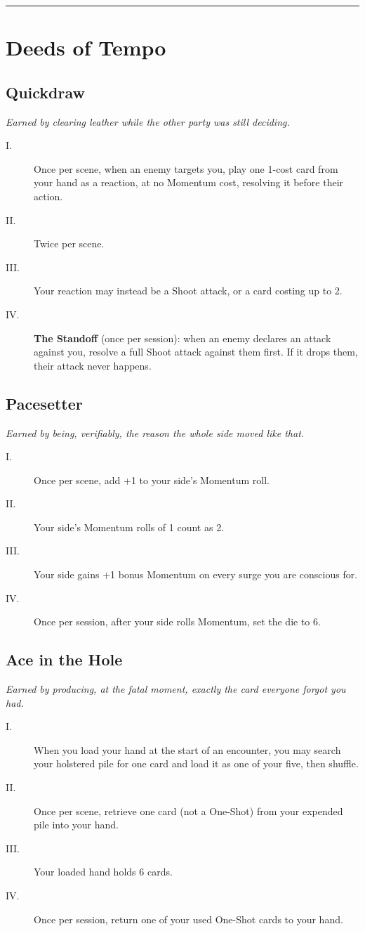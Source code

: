 \medskip\hrule\medskip

\section{Deeds of Tempo}

\subsection{Quickdraw}
\textit{Earned by clearing leather while the other party was still deciding.}
\begin{description}
    \item[I.] Once per scene, when an enemy targets you, play one 1-cost card from your hand as a reaction, at no Momentum cost, resolving it before their action.
    \item[II.] Twice per scene.
    \item[III.] Your reaction may instead be a Shoot attack, or a card costing up to 2.
    \item[IV.] \textbf{The Standoff} (once per session): when an enemy declares an attack against you, resolve a full Shoot attack against them first. If it drops them, their attack never happens.
\end{description}

\subsection{Pacesetter}
\textit{Earned by being, verifiably, the reason the whole side moved like that.}
\begin{description}
    \item[I.] Once per scene, add +1 to your side's Momentum roll.
    \item[II.] Your side's Momentum rolls of 1 count as 2.
    \item[III.] Your side gains +1 bonus Momentum on every surge you are conscious for.
    \item[IV.] Once per session, after your side rolls Momentum, set the die to 6.
\end{description}

\subsection{Ace in the Hole}
\textit{Earned by producing, at the fatal moment, exactly the card everyone forgot you had.}
\begin{description}
    \item[I.] When you load your hand at the start of an encounter, you may search your holstered pile for one card and load it as one of your five, then shuffle.
    \item[II.] Once per scene, retrieve one card (not a One-Shot) from your expended pile into your hand.
    \item[III.] Your loaded hand holds 6 cards.
    \item[IV.] Once per session, return one of your used One-Shot cards to your hand.
\end{description}

